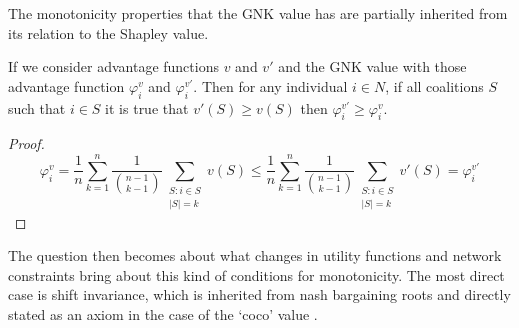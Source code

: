 The monotonicity properties that the GNK value has are partially inherited from its relation to the Shapley value.

\begin{theorem}\label{thm:monotonicity}
If we consider advantage functions $v$ and $v'$ and the GNK value with those advantage function $\varphi^v_i$ and $\varphi^{v'}_i$.
Then for any individual $i\in N$, if all coalitions $S$ such that $i\in S$ it is true that $v'(S)\ge v(S)$ then $\varphi^{v'}_i \ge \varphi^v_i$.
\end{theorem}
\begin{proof}
$$\varphi^v_i = \frac{1}{n}\sum_{k=1}^n \frac{1}{\binom{n-1}{k-1}} \sum_{\substack{S:i\in S \\ |S|=k}}v(S) \le \frac{1}{n}\sum_{k=1}^n \frac{1}{\binom{n-1}{k-1}} \sum_{\substack{S:i\in S \\ |S|=k}}v'(S) =\varphi^{v'}_i$$
\end{proof}

The question then becomes about what changes in utility functions and network constraints bring about this kind of conditions for monotonicity. The most direct case is shift invariance, which is inherited from nash bargaining roots \cite{nash2} and directly stated as an axiom in the case of the `coco' value \cite{kalai1}.

